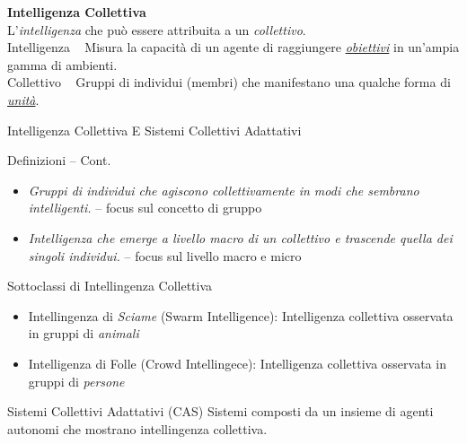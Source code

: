 \documentclass[presentation, 10pt,aspectratio=169]{beamer}\mode<presentation>{\usetheme{AMSBolognaFC}}
\begin{document}
{


\begin{frame}[c]
	
	{
	\color{customfg}

	\begin{center}
	\Large\textbf{Intelligenza Collettiva} \\
	
	L'\alert{\emph{intelligenza}} che può essere attribuita a un \alert{\emph{collettivo}}.
	\\ \vspace{1cm}
		\large{\alert{Intelligenza}} \faArrowRight ~ Misura la capacità di un agente di raggiungere \underline{\emph{obiettivi}} in un'ampia gamma di ambienti.  \\

		\large{\alert{Collettivo}} \faArrowRight ~ Gruppi di individui (membri) che manifestano una qualche forma di \underline{\emph{unità}}. \\
	\end{center}

	\vspace{1cm}	
}
\end{frame}
}
\begin{frame}{Intelligenza Collettiva E Sistemi Collettivi Adattativi}
	\begin{alertblock}{Definizioni -- Cont.}
		\begin{itemize}
			\item \emph{Gruppi di individui che agiscono collettivamente in modi che sembrano intelligenti.} -- focus sul concetto di \alert{gruppo}
			\item \emph{Intelligenza che emerge a livello macro di un collettivo e trascende quella dei singoli individui.} -- focus sul livello \alert{macro} e \alert{micro}
		\end{itemize}
	\end{alertblock}
	\begin{exampleblock}{Sottoclassi di Intellingenza Collettiva}
		\begin{itemize}
			\item Intellingenza di \emph{Sciame} (\alert{Swarm Intelligence}): Intelligenza collettiva osservata in gruppi di \emph{animali}
			\item Intelligenza di Folle (\alert{Crowd Intellingece}): Intelligenza collettiva osservata in gruppi di \emph {persone}
		\end{itemize}
	\end{exampleblock}
	\begin{block}{Sistemi Collettivi Adattativi (CAS)}
		Sistemi composti da un insieme di agenti autonomi che mostrano intellingenza collettiva.
	\end{block}
\end{frame}
\end{document}
